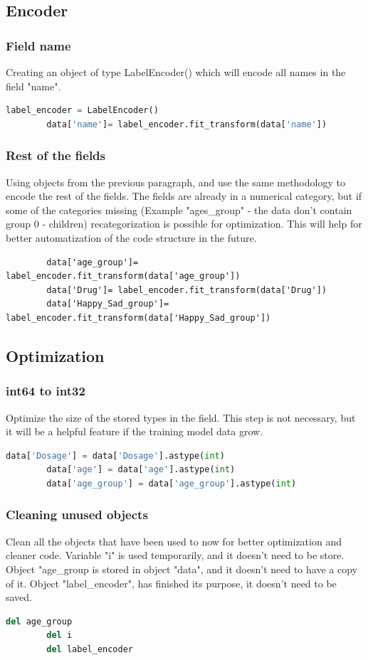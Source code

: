 \documentclass{article}
\begin{document}
    \subsection{Encoder}
    \subsubsection{Field name}
    Creating an object of type LabelEncoder() which will encode all names in the field "name".
    \begin{lstlisting}[language=Python]
        label_encoder = LabelEncoder()
        data['name']= label_encoder.fit_transform(data['name'])
    \end{lstlisting}
    \subsubsection{Rest of the fields}
    Using objects from the previous paragraph, and use the same methodology to encode the rest of the fields.
    The fields are already in a numerical category, but if some of the categories missing
    (Example "ages\_group" - the data don't contain group 0 - children)
    recategorization is possible for optimization.
    This will help for better automatization of the code structure in the future.
    \begin{lstlisting}
        data['age_group']= label_encoder.fit_transform(data['age_group'])
        data['Drug']= label_encoder.fit_transform(data['Drug'])
        data['Happy_Sad_group']= label_encoder.fit_transform(data['Happy_Sad_group'])
    \end{lstlisting}
    \subsection{Optimization}
    \subsubsection{int64 to int32}
    Optimize the size of the stored types in the field.
    This step is not necessary, but it will be a helpful feature if the training model data grow.
    \begin{lstlisting}[language=Python]
        data['Dosage'] = data['Dosage'].astype(int)
        data['age'] = data['age'].astype(int)
        data['age_group'] = data['age_group'].astype(int)
    \end{lstlisting}
    \subsubsection{Cleaning unused objects}
    Clean all the objects that have been used to now for better optimization and cleaner code.
    Variable "i" is used temporarily, and it doesn't need to be store.
    Object "age\_group is stored in object "data", and it doesn't need to have a copy of it.
    Object "label\_encoder", has finished its purpose, it doesn't need to be saved.
    \begin{lstlisting}[language=Python]
        del age_group
        del i
        del label_encoder
    \end{lstlisting}
    \newpage
\end{document}
